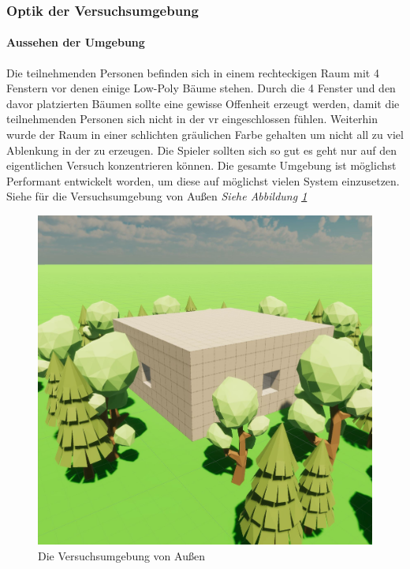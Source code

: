\documentclass[a4paper,11pt]{article}%
\renewcommand{\\}{\vspace*{0.5\baselineskip} \newline}
\begin{document}
\subsubsection{Optik der Versuchsumgebung}
\paragraph{Aussehen der Umgebung}
Die teilnehmenden Personen befinden sich in einem rechteckigen Raum mit 4 Fenstern vor denen einige Low-Poly Bäume stehen. Durch die 4 Fenster und den davor platzierten Bäumen sollte eine gewisse Offenheit erzeugt werden, damit die teilnehmenden Personen sich nicht in der \ac{vr} eingeschlossen fühlen. Weiterhin wurde der Raum in einer schlichten gräulichen Farbe gehalten um nicht all zu viel Ablenkung in der zu erzeugen. Die Spieler sollten sich so gut es geht nur auf den eigentlichen Versuch konzentrieren können. Die gesamte Umgebung ist möglichst Performant entwickelt worden, um diese auf möglichst vielen System einzusetzen. Siehe für die Versuchsumgebung von Außen \textit{Siehe Abbildung \ref{Versuchsumgebung}} 

\begin{figure}[H]
		\begin{footnotesize}
		\centering
			\includegraphics[scale=0.4]{Abbildungen/Versuchsumgebung/Raum.JPG}\\
			\caption[Abbildung 1]{Die Versuchsumgebung von Außen}
			\label{Versuchsumgebung}
		\end{footnotesize}
	\end{figure}
\end{document}
